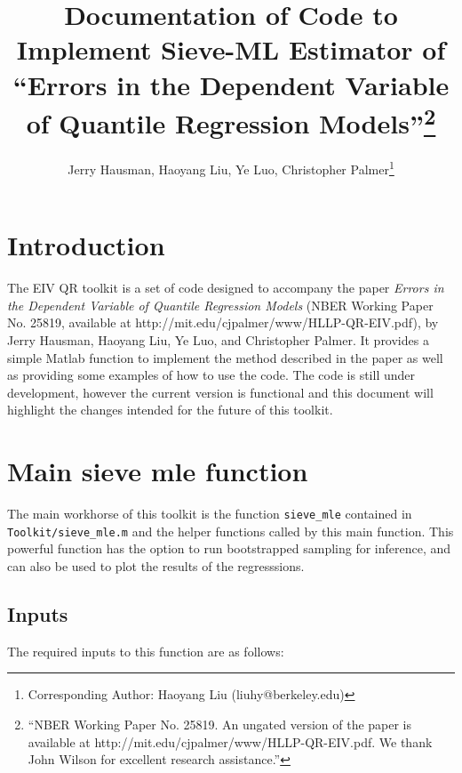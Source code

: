 \documentclass[12pt]{article}
\title{Documentation of Code to Implement Sieve-ML Estimator of ``Errors in the Dependent Variable of Quantile Regression Models''\footnote{“NBER Working Paper No. 25819. An ungated version of the paper is available at http://mit.edu/cjpalmer/www/HLLP-QR-EIV.pdf. We thank John Wilson for excellent research assistance.”}}
\author{Jerry Hausman, Haoyang Liu, Ye Luo, Christopher Palmer\footnote{Corresponding Author: Haoyang Liu (liuhy@berkeley.edu)}}
\begin{document}
\nocite{*}
\maketitle

\tableofcontents

\newpage

\section{Introduction}

The EIV QR toolkit is a set of code designed to accompany the paper \textit{Errors in the Dependent Variable of Quantile Regression Models} (NBER Working Paper No. 25819, available at http://mit.edu/cjpalmer/www/HLLP-QR-EIV.pdf), by Jerry Hausman, Haoyang Liu, Ye Luo, and Christopher Palmer. It provides a simple Matlab function to implement the method described in the paper as well as providing some examples of how to use the code. The code is still under development, however the current version is functional and this document will highlight the changes intended for the future of this toolkit.

\section{Main sieve mle function}

The main workhorse of this toolkit is the function \lstinline{sieve_mle} contained in \lstinline{Toolkit/sieve_mle.m} and the helper functions called by this main function. This powerful function has the option to run bootstrapped sampling for inference, and can also be used to plot the results of the regresssions.

\subsection{Inputs}

The required inputs to this function are as follows:
\end{document}
